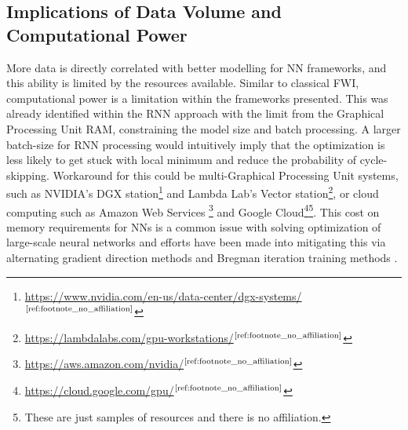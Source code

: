 \subsection{Implications of Data Volume and Computational Power}
More data is directly correlated with better modelling for NN frameworks, and this ability is limited by the resources available. Similar to classical FWI, computational power is a limitation within the frameworks presented. This was already identified within the RNN approach with the limit from the Graphical Processing Unit RAM, constraining the model size and batch processing. A larger batch-size for RNN processing would intuitively imply that the optimization is less likely to get stuck with local minimum and reduce the probability of cycle-skipping. Workaround for this could be multi-Graphical Processing Unit systems, such as NVIDIA's DGX station\footnote{\url{https://www.nvidia.com/en-us/data-center/dgx-systems/}$\textsuperscript{\ref{ref:footnote_no_affiliation}}$} and  Lambda Lab's Vector station\footnote{\url{https://lambdalabs.com/gpu-workstations/}$\textsuperscript{\ref{ref:footnote_no_affiliation}}$}, or cloud computing such as Amazon Web Services \footnote{\url{https://aws.amazon.com/nvidia/}$\textsuperscript{\ref{ref:footnote_no_affiliation}}$} and Google Cloud\footnote{\url{https://cloud.google.com/gpu/}$\textsuperscript{\ref{ref:footnote_no_affiliation}}$}\footnote{\label{ref:footnote_no_affiliation}These are just samples of resources and there is no affiliation.}. This cost on memory requirements for \acp{NN} is a common issue with solving optimization of large-scale neural networks \citep{Bottou2018} and efforts have been made into mitigating this via alternating gradient direction methods and Bregman iteration training methods \citep{Boyd2011, Taylor2016}.




